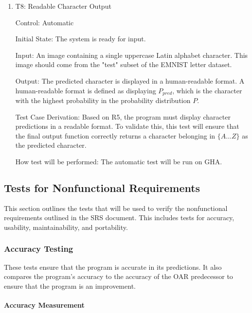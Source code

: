 \documentclass[12pt, titlepage]{article}
\begin{document}
\begin{enumerate}

\item{T8: Readable Character Output\\}

Control: Automatic

Initial State: The \progname{} system is ready for input.

Input: An image containing a single uppercase Latin alphabet character. This
image should come from the "test" subset of the EMNIST letter dataset.

Output: The predicted character is displayed in a human-readable format.
A human-readable format is defined as displaying $P_{pred}$, which is the
character with the highest probability in the probability distribution $P$.

Test Case Derivation: Based on R5, the program must display character
predictions in a readable format. To validate this, this test will ensure
that the final output function correctly returns a character belonging in
${\{A...Z\}}$ as the predicted character.

How test will be performed: The automatic test will be run on GHA.

\end{enumerate}

\subsection{Tests for Nonfunctional Requirements}

This section outlines the tests that will be used to verify the nonfunctional
requirements outlined in the SRS document. This includes tests for accuracy,
usability, maintainability, and portability.

\subsubsection{Accuracy Testing}

These tests ensure that the program is accurate in its predictions. It also
compares the program's accuracy to the accuracy of the OAR predecessor to
ensure that the program is an improvement.

\paragraph{Accuracy Measurement}
\end{document}
